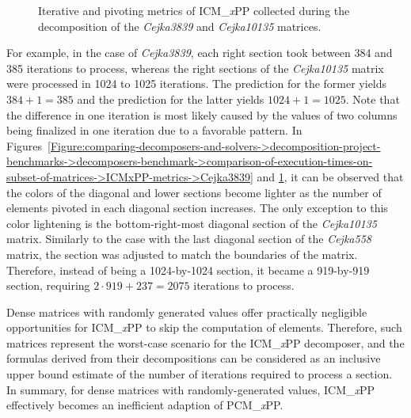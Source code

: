 \begin{figure}[ht!]
\begin{subfigure}[t]{0.48\textwidth}
		\label{Figure:comparing-decomposers-and-solvers->decomposition-project-benchmarks->decomposers-benchmark->comparison-of-execution-times-on-subset-of-matrices->ICMxPP-metrics->Cejka10135}
	\end{subfigure}
	\caption{Iterative and pivoting metrics of ICM\_\textit{x}PP collected during the decomposition of the \textit{Cejka3839} and \textit{Cejka10135} matrices.}
	\label{Figure:comparing-decomposers-and-solvers->decomposition-project-benchmarks->decomposers-benchmark->comparison-of-execution-times-on-subset-of-matrices->ICMxPP-metrics->Cejka3839-and-Cejka10135}
\end{figure}

For example, in the case of \textit{Cejka3839}, each right section took between 384 and 385 iterations to process, whereas the right sections of the \textit{Cejka10135} matrix were processed in 1024 to 1025 iterations.
The prediction for the former yields $384 + 1 = 385$ and the prediction for the latter yields $1024 + 1 = 1025$.
Note that the difference in one iteration is most likely caused by the values of two columns being finalized in one iteration due to a favorable pattern.
In Figures~\ref{Figure:comparing-decomposers-and-solvers->decomposition-project-benchmarks->decomposers-benchmark->comparison-of-execution-times-on-subset-of-matrices->ICMxPP-metrics->Cejka3839} and \ref{Figure:comparing-decomposers-and-solvers->decomposition-project-benchmarks->decomposers-benchmark->comparison-of-execution-times-on-subset-of-matrices->ICMxPP-metrics->Cejka10135}, it can be observed that the colors of the diagonal and lower sections become lighter as the number of elements pivoted in each diagonal section increases.
The only exception to this color lightening is the bottom-right-most diagonal section of the \textit{Cejka10135} matrix.
Similarly to the case with the last diagonal section of the \textit{Cejka558} matrix, the section was adjusted to match the boundaries of the matrix.
Therefore, instead of being a 1024-by-1024 section, it became a 919-by-919 section, requiring $2\cdot 919 + 237 = 2075$ iterations to process.

Dense matrices with randomly generated values offer practically negligible opportunities for ICM\_\textit{x}PP to skip the computation of elements.
Therefore, such matrices represent the worst-case scenario for the ICM\_\textit{x}PP decomposer, and the formulas derived from their decompositions can be considered as an inclusive upper bound estimate of the number of iterations required to process a section.
In summary, for dense matrices with randomly-generated values, ICM\_\textit{x}PP effectively becomes an inefficient adaption of PCM\_\textit{x}PP.

